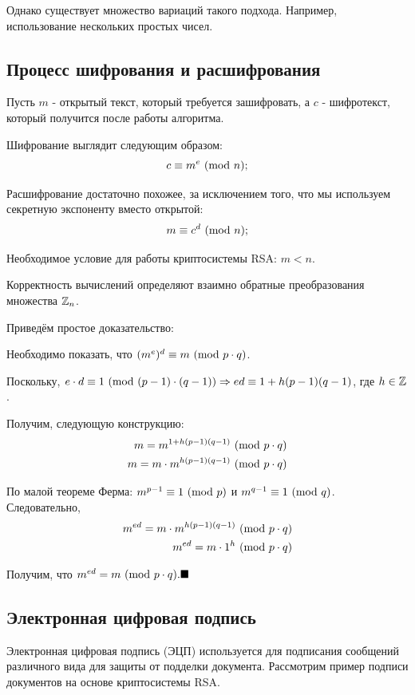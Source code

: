 Однако существует множество вариаций такого подхода. Например, использование нескольких простых чисел.

\subsection{Процесс шифрования и расшифрования}

Пусть $m$ - открытый текст, который требуется зашифровать, а $c$ - шифротекст, который получится после работы алгоритма.

Шифрование выглядит следующим образом:
$$
c \equiv m^e \ (\mathrm{mod}\ n);
$$

Расшифрование достаточно похожее, за исключением того, что мы используем секретную экспоненту вместо открытой:
$$
m \equiv c^d \ (\mathrm{mod}\ n);
$$

Необходимое условие для работы криптосистемы RSA: $m < n$.

Корректность вычислений определяют взаимно обратные преобразования множества $\mathbb{Z}_n$.

Приведём простое доказательство:

Необходимо показать, что $(m^e)^d \equiv m \ (\mathrm{mod}\ p \cdot q)$.

Поскольку, $e \cdot d \equiv 1 \ (\mathrm{mod}\ (p-1) \cdot (q-1)) \Rightarrow ed \equiv 1 + h(p-1)(q-1)$, где $h \in \mathbb{Z}$.

Получим, следующую конструкцию:
\begin{align*}
    m = m^{1 + h(p-1)(q-1)} \ (\mathrm{mod}\ p \cdot q) \\
    m = m \cdot m^{h(p-1)(q-1)} \ (\mathrm{mod}\ p \cdot q)
\end{align*}

По малой теореме Ферма: $m^{p-1} \equiv 1 \ (\mathrm{mod}\ p)$ и $m^{q-1} \equiv 1 \ (\mathrm{mod}\ q)$. Следовательно,
\begin{align*}
    m^{ed} = m \cdot m^{h(p-1)(q-1)} \ (\mathrm{mod}\ p \cdot q) \\
    m^{ed} = m \cdot 1^h \ (\mathrm{mod}\ p \cdot q)
\end{align*}

Получим, что $m^{ed} = m \ (\mathrm{mod}\ p \cdot q). \blacksquare$
\newpage

\subsection{Электронная цифровая подпись}

Электронная цифровая подпись (ЭЦП) используется для подписания сообщений различного вида для защиты от подделки документа.
Рассмотрим пример подписи документов на основе криптосистемы RSA.

